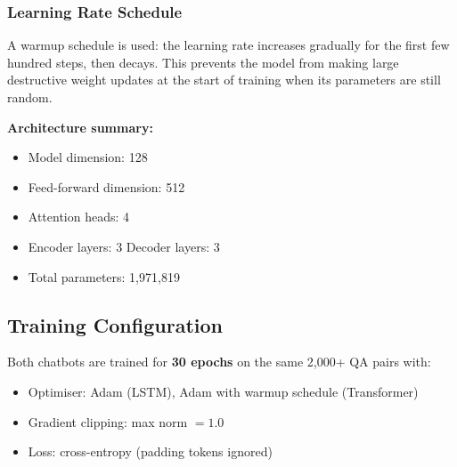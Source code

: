 \subsubsection*{Learning Rate Schedule}

A warmup schedule is used: the learning rate increases gradually for the first
few hundred steps, then decays. This prevents the model from making large
destructive weight updates at the start of training when its parameters are still
random.

\textbf{Architecture summary:}
\begin{itemize}
    \item Model dimension: 128
    \item Feed-forward dimension: 512
    \item Attention heads: 4
    \item Encoder layers: 3 \quad Decoder layers: 3
    \item Total parameters: 1,971,819
\end{itemize}

\subsection{Training Configuration}

Both chatbots are trained for \textbf{30 epochs} on the same 2,000+ QA pairs with:
\begin{itemize}
    \item Optimiser: Adam (LSTM), Adam with warmup schedule (Transformer)
    \item Gradient clipping: max norm $= 1.0$
    \item Loss: cross-entropy (padding tokens ignored)
\end{itemize}
